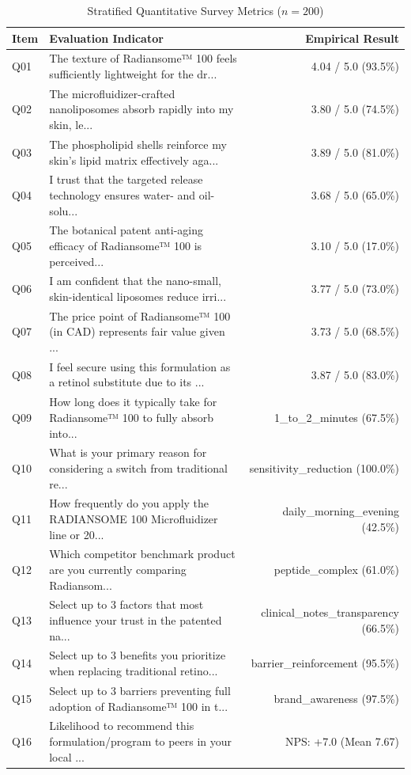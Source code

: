 \documentclass[10pt,twocolumn,a4paper]{article}
\begin{document}
\begin{table}[t]
\centering
\caption{Stratified Quantitative Survey Metrics ($n = 200$)}
\label{tab:metrics}
\small
\begin{tabularx}{\textwidth}{l X r}
\toprule
\textbf{Item} & \textbf{Evaluation Indicator} & \textbf{Empirical Result} \\
\midrule
Q01 & The texture of Radiansome™ 100 feels sufficiently lightweight for the dr... & 4.04 / 5.0 (93.5\%) \\
Q02 & The microfluidizer-crafted nanoliposomes absorb rapidly into my skin, le... & 3.80 / 5.0 (74.5\%) \\
Q03 & The phospholipid shells reinforce my skin's lipid matrix effectively aga... & 3.89 / 5.0 (81.0\%) \\
Q04 & I trust that the targeted release technology ensures water- and oil-solu... & 3.68 / 5.0 (65.0\%) \\
Q05 & The botanical patent anti-aging efficacy of Radiansome™ 100 is perceived... & 3.10 / 5.0 (17.0\%) \\
Q06 & I am confident that the nano-small, skin-identical liposomes reduce irri... & 3.77 / 5.0 (73.0\%) \\
Q07 & The price point of Radiansome™ 100 (in CAD) represents fair value given ... & 3.73 / 5.0 (68.5\%) \\
Q08 & I feel secure using this formulation as a retinol substitute due to its ... & 3.87 / 5.0 (83.0\%) \\
Q09 & How long does it typically take for Radiansome™ 100 to fully absorb into... & 1\_to\_2\_minutes (67.5\%) \\
Q10 & What is your primary reason for considering a switch from traditional re... & sensitivity\_reduction (100.0\%) \\
Q11 & How frequently do you apply the RADIANSOME 100 Microfluidizer line or 20... & daily\_morning\_evening (42.5\%) \\
Q12 & Which competitor benchmark product are you currently comparing Radiansom... & peptide\_complex (61.0\%) \\
Q13 & Select up to 3 factors that most influence your trust in the patented na... & clinical\_notes\_transparency (66.5\%) \\
Q14 & Select up to 3 benefits you prioritize when replacing traditional retino... & barrier\_reinforcement (95.5\%) \\
Q15 & Select up to 3 barriers preventing full adoption of Radiansome™ 100 in t... & brand\_awareness (97.5\%) \\
Q16 & Likelihood to recommend this formulation/program to peers in your local ... & NPS: +7.0 (Mean 7.67) \\
\bottomrule
\end{tabularx}
\end{table}
\end{document}
